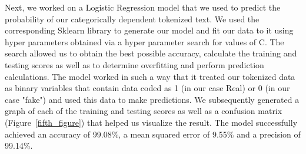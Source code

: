 \documentclass[10pt,twocolumn,letterpaper]{article}
\begin{document}
Next, we worked on a Logistic Regression model that we used to predict the probability of our categorically dependent tokenized text. We used the corresponding Sklearn library to generate our model and fit our data to it using hyper parameters obtained via a hyper parameter search for values of C. The search allowed us to obtain the best possible accuracy, calculate the training and testing scores as well as to determine overfitting and perform prediction calculations. The model worked in such a way that it treated our tokenized data as binary variables that contain data coded as 1 (in our case Real) or 0 (in our case "fake") and used this data to make predictions. We subsequently generated a graph of each of the training and testing scores as well as a confusion matrix (Figure~\ref{fifth_figure}) that helped us visualize the result. The model successfully achieved an accuracy of 99.08\%, a mean squared error of 9.55\% and a precision of 99.14\%. \\
\end{document}
